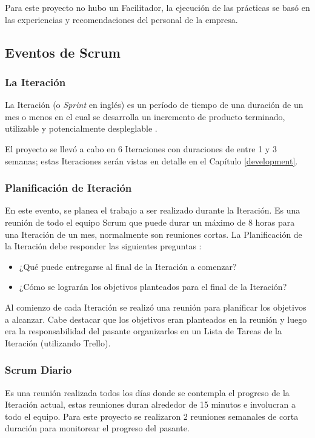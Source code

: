 Para este proyecto no hubo un Facilitador, la ejecución de las prácticas se basó en las experiencias y recomendaciones del personal de la empresa.

\subsection{Eventos de Scrum}
\subsubsection{La Iteración} \label{sprint}
La Iteración (o \emph{Sprint} en inglés) es un período de tiempo de una duración de un mes o menos en el cual se desarrolla un incremento de producto terminado, utilizable y potencialmente despleglable \cite{scrumSchwaber}.

El proyecto se llevó a cabo en 6 Iteraciones con duraciones de entre 1 y 3 semanas; estas Iteraciones serán vistas en detalle en el Capítulo \ref{development}.

\subsubsection{Planificación de Iteración}
En este evento, se planea el trabajo a ser realizado durante la Iteración. Es una reunión de todo el equipo Scrum que puede durar un máximo de 8 horas para una Iteración de un mes, normalmente son reuniones cortas. La Planificación de la Iteración debe responder las siguientes preguntas \cite{scrumSchwaber}:

\begin{itemize}
    \item ¿Qué puede entregarse al final de la Iteración a comenzar?
    \item ¿Cómo se lograrán los objetivos planteados para el final de la Iteración?
\end{itemize}

Al comienzo de cada Iteración se realizó una reunión para planificar los objetivos a alcanzar. Cabe destacar que los objetivos eran planteados en la reunión y luego era la responsabilidad del pasante organizarlos en un Lista de Tareas de la Iteración (utilizando Trello).

\subsubsection{Scrum Diario}
Es una reunión realizada todos los días donde se contempla el progreso de la Iteración actual, estas reuniones duran alrededor de 15 minutos e involucran a todo el equipo. Para este proyecto se realizaron 2 reuniones semanales de corta duración para monitorear el progreso del pasante.

